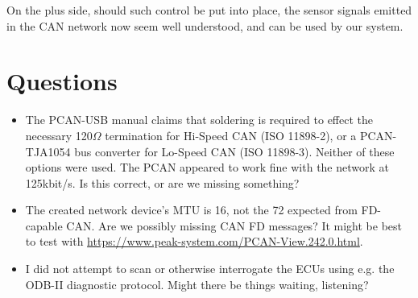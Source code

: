\documentclass[letterpaper,10pt]{article}
\begin{document}
On the plus side, should such control be put into place, the sensor signals
emitted in the CAN network now seem well understood, and can be used by our
system.

\section{Questions}
\begin{itemize}
\item The PCAN-USB manual claims that soldering is required to effect the
  necessary 120$\Omega$ termination for Hi-Speed CAN (ISO 11898-2), or a
  PCAN-TJA1054 bus converter for Lo-Speed CAN (ISO 11898-3)\parencite{iso118983}.
  Neither of these options were used. The PCAN appeared to work fine with the
  network at 125kbit/s. Is this correct, or are we missing something?
\item The created network device's MTU is 16, not the 72 expected from
  FD-capable CAN. Are we possibly missing CAN FD messages? It might be best to
  test with \href{PCAN-View}{https://www.peak-system.com/PCAN-View.242.0.html}.
\item I did not attempt to scan or otherwise interrogate the ECUs using e.g.
  the ODB-II diagnostic protocol. Might there be things waiting, listening?
\end{itemize}
\printbibliography
\end{document}
